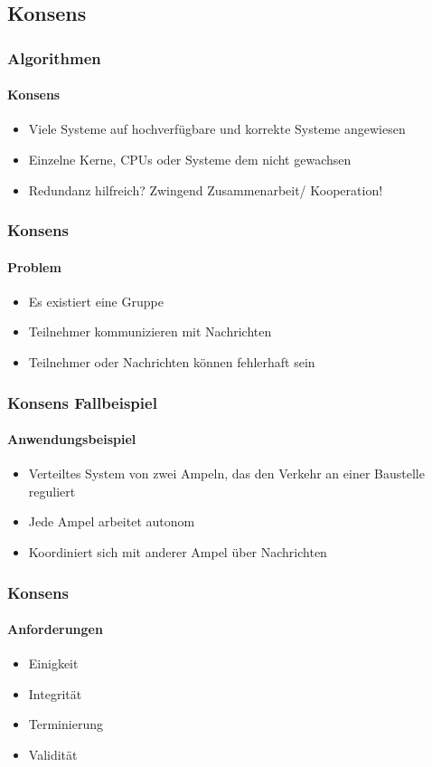 
\subsection{Konsens}
\begin{frame}
  \frametitle{Algorithmen}
  \framesubtitle{Konsens}
  \begin{itemize}
    \item Viele Systeme auf hochverfügbare und korrekte Systeme angewiesen
    \item Einzelne Kerne, CPUs oder Systeme dem nicht gewachsen
    \item Redundanz hilfreich? Zwingend Zusammenarbeit/ Kooperation!
  \end{itemize}
\end{frame}


\begin{frame}
  \frametitle{Konsens}
  \framesubtitle{Problem}
  \begin{itemize}
    \item Es existiert eine Gruppe 
    \item Teilnehmer kommunizieren mit Nachrichten
    \item Teilnehmer oder Nachrichten können fehlerhaft sein
  \end{itemize}
\end{frame}

\begin{frame}
  \frametitle{Konsens Fallbeispiel}
  \framesubtitle{Anwendungsbeispiel}
  \begin{itemize}
  \item Verteiltes System von zwei Ampeln, das den Verkehr an einer Baustelle reguliert
  \item Jede Ampel arbeitet autonom 
  \item Koordiniert sich mit anderer Ampel über Nachrichten
  \end{itemize}
\end{frame}

\begin{frame}
  \frametitle{Konsens}
  \framesubtitle{Anforderungen}
  \begin{itemize}
    \item Einigkeit
    \item Integrität
    \item Terminierung
    \item Validität
  \end{itemize}
\end{frame}


